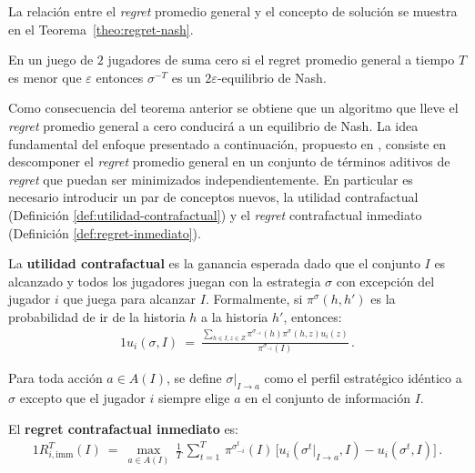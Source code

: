La relación entre el \textit{regret} promedio general y el concepto de solución se muestra en el Teorema~\ref{theo:regret-nash}.
\begin{theorem}
\label{theo:regret-nash}
En un juego de $2$ jugadores de suma cero si el regret promedio general a tiempo $T$ es menor que $\varepsilon$ entonces $\sigma^{-T}$ es un $2\varepsilon$-equilibrio de Nash.
\end{theorem}

Como consecuencia del teorema anterior se obtiene que un algoritmo que lleve el \mbox{\textit{regret}} promedio general a cero conducirá a un equilibrio de Nash. La idea fundamental del enfoque presentado a continuación, propuesto en \cite{bib:cfr}, consiste en descomponer el \textit{regret} promedio general en un conjunto de términos aditivos de \textit{regret} que puedan ser minimizados independientemente. En particular es necesario introducir un par de conceptos nuevos, la utilidad contrafactual (Definición \ref{def:utilidad-contrafactual}) y el \textit{regret} contrafactual inmediato (Definición \ref{def:regret-inmediato}).

\begin{definition}
\label{def:utilidad-contrafactual}
La \textbf{utilidad contrafactual} es la ganancia esperada dado que el conjunto $I$ es alcanzado y todos los jugadores juegan con la estrategia $\sigma$ con excepción del jugador $i$ que juega para alcanzar $I$. Formalmente, si $\pi^{\sigma}(h, h')$ es la probabilidad de ir de la historia $h$ a la historia $h'$, entonces:
\begin{alignat}{1}
u_i(\sigma, I)\ =\ \frac{\sum_{h \in I, z \in Z} \pi^{\sigma_{-i}}(h) \pi^{\sigma}(h, z) u_i(z)}{\pi^{\sigma_{-i}}(I)} \,.
\end{alignat}
\end{definition}

Para toda acción $a \in A(I)$, se define $\sigma|_{I \rightarrow a}$ como el perfil estratégico idéntico a $\sigma$ excepto que el jugador $i$ siempre elige $a$ en el conjunto de información $I$.

\begin{definition}
\label{def:regret-inmediato}
El \textbf{regret contrafactual inmediato} es:
\begin{alignat}{1}
R_{i, \text{imm}}^T(I)\ =\  \max_{a \in A(I)} \, \frac{1}{T} \, \sum_{t = 1}^T \, \pi^{\sigma_{-i}^t}(I) \, \bigl[ u_i(\sigma^t|_{I \rightarrow a}, I) - u_i(\sigma^t, I) \bigr]\,.
\end{alignat}
\end{definition}

